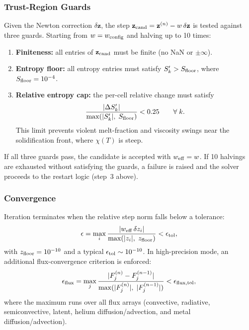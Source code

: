 \documentclass{aastex631}
\begin{document}
\subsubsection{Trust-Region Guards}\label{sec:trust}

Given the Newton correction $\delta\mathbf{z}$, the step
$\mathbf{z}_{\rm cand} = \mathbf{z}^{(n)} - w\,\delta\mathbf{z}$
is tested against three guards.  Starting from $w = w_{\rm config}$
and halving up to 10 times:
\begin{enumerate}
  \item \textbf{Finiteness:} all entries of $\mathbf{z}_{\rm cand}$
    must be finite (no NaN or $\pm\infty$).
  \item \textbf{Entropy floor:} all entropy entries must satisfy
    $S'_k > S_{\rm floor}$, where $S_{\rm floor} = 10^{-4}$.
  \item \textbf{Relative entropy cap:} the per-cell relative change
    must satisfy
    \begin{equation}\label{eq:trust_cap}
      \frac{|\Delta S'_k|}{\max(|S'_k|,\;S_{\rm floor})}
      < 0.25
      \qquad \forall\;k.
    \end{equation}
    This limit prevents violent melt-fraction and viscosity swings
    near the solidification front, where $\chi(T)$ is steep.
\end{enumerate}
If all three guards pass, the candidate is accepted with
$w_{\rm eff} = w$.  If 10 halvings are exhausted without
satisfying the guards, a failure is raised and the solver
proceeds to the restart logic (step~3 above).

\subsubsection{Convergence}\label{sec:convergence}

Iteration terminates when the relative step norm falls below
a tolerance:
\begin{equation}\label{eq:conv_crit}
  \epsilon
  = \max_i \frac{|w_{\rm eff}\,\delta z_i|}
                 {\max(|z_i|,\;z_{\rm floor})}
  < \epsilon_{\rm tol},
\end{equation}
with $z_{\rm floor} = 10^{-10}$ and a typical
$\epsilon_{\rm tol}\sim10^{-10}$.  In high-precision mode, an
additional flux-convergence criterion is enforced:
\begin{equation}\label{eq:flux_conv}
  \epsilon_{\rm flux}
  = \max_j\frac{|F_j^{(n)} - F_j^{(n-1)}|}
               {\max(|F_j^{(n)}|,\;|F_j^{(n-1)}|)}
  < \epsilon_{\rm flux,tol},
\end{equation}
where the maximum runs over all flux arrays (convective, radiative,
semiconvective, latent, helium diffusion/advection, and metal
diffusion/advection).
\end{document}
